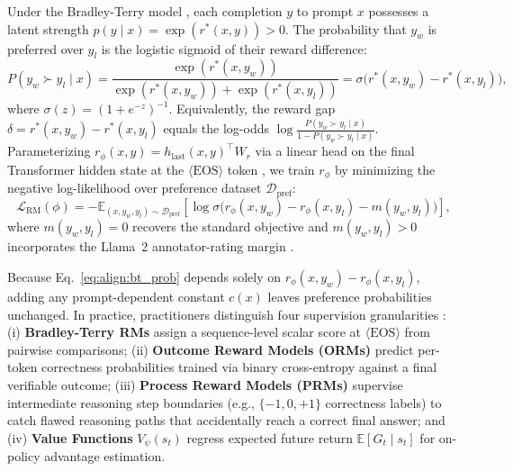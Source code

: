 \documentclass[../../../../master.tex]{subfiles}
\begin{document}
\begin{coremath}
Under the Bradley-Terry model  , each completion $y$ to prompt $x$ possesses a latent strength $p(y \mid x) = \exp(r^*(x,y)) > 0$. The probability that $y_w$ is preferred over $y_l$ is the logistic sigmoid of their reward difference:
\begin{equation}
\label{eq:align:bt_prob}
P(y_w \succ y_l \mid x) = \frac{\exp(r^*(x, y_w))}{\exp(r^*(x, y_w)) + \exp(r^*(x, y_l))} = \sigma\!\big(r^*(x, y_w) - r^*(x, y_l)\big),
\end{equation}
where $\sigma(z) = (1 + e^{-z})^{-1}$. Equivalently, the reward gap $\delta = r^*(x, y_w) - r^*(x, y_l)$ equals the log-odds $\log \frac{P(y_w \succ y_l \mid x)}{1 - P(y_w \succ y_l \mid x)}$. Parameterizing $r_\phi(x,y) = h_{\mathrm{last}}(x,y)^\top W_r$ via a linear head on the final Transformer hidden state at the $\langle\mathrm{EOS}\rangle$ token , we train $r_\phi$ by minimizing the negative log-likelihood over preference dataset $\mathcal{D}_{\mathrm{pref}}$:
\begin{equation}
\label{eq:align:bt_loss}
\mathcal{L}_{\mathrm{RM}}(\phi) = -\mathbb{E}_{(x, y_w, y_l) \sim \mathcal{D}_{\mathrm{pref}}} \!\left[ \log \sigma\!\big(r_\phi(x, y_w) - r_\phi(x, y_l) - m(y_w, y_l)\big) \right],
\end{equation}
where $m(y_w, y_l) = 0$ recovers the standard objective and $m(y_w, y_l) > 0$ incorporates the Llama~2 annotator-rating margin .
\end{coremath}

\begin{intuition}
Because Eq.~\eqref{eq:align:bt_prob} depends solely on $r_\phi(x, y_w) - r_\phi(x, y_l)$, adding any prompt-dependent constant $c(x)$ leaves preference probabilities unchanged. In practice, practitioners distinguish four supervision granularities   : (i) \textbf{Bradley-Terry RMs} assign a sequence-level scalar score at $\langle\mathrm{EOS}\rangle$ from pairwise comparisons; (ii) \textbf{Outcome Reward Models (ORMs)} predict per-token correctness probabilities trained via binary cross-entropy against a final verifiable outcome; (iii) \textbf{Process Reward Models (PRMs)} supervise intermediate reasoning step boundaries (e.g., $\{-1, 0, +1\}$ correctness labels) to catch flawed reasoning paths that accidentally reach a correct final answer; and (iv) \textbf{Value Functions} $V_\psi(s_t)$ regress expected future return $\mathbb{E}[G_t \mid s_t]$ for on-policy advantage estimation.
\end{intuition}
\end{document}
